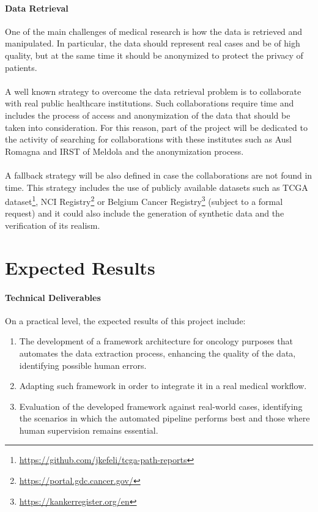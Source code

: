 \documentclass{scrartcl}
\begin{document}
\paragraph{Data Retrieval}{One of the main challenges of medical research is how the data is retrieved and manipulated. 
In particular, the data should represent real cases and be of high quality, but at the same time it should be anonymized to protect the privacy of patients.   
\\\\
A well known strategy to overcome the data retrieval problem is to collaborate with real public healthcare institutions. Such collaborations require time and includes the process of access and anonymization of the data that should be taken into consideration. For this reason, part of the project will be dedicated to the activity of searching for collaborations with these institutes such as Ausl Romagna and IRST of Meldola and the anonymization process.
\\\\
A fallback strategy will be also defined in case the collaborations are not found in time. This strategy includes the use of publicly available datasets such as TCGA dataset\footnote{\url{https://github.com/jkefeli/tcga-path-reports}}, NCI Registry\footnote{\url{https://portal.gdc.cancer.gov/}} or Belgium Cancer Registry\footnote{\url{https://kankerregister.org/en}} (subject to a formal request) and it could also include the generation of synthetic data and the verification of its realism.
}
\section{Expected Results}

\paragraph{Technical Deliverables}{On a practical level, the expected results of this project include:
\begin{enumerate}
    \item The development of a framework architecture for oncology purposes that automates the data extraction process, enhancing the quality of the data, identifying possible human errors.
    \item Adapting such framework in order to integrate it in a real medical workflow.
    \item Evaluation of the developed framework against real-world cases, identifying the scenarios in which the automated pipeline performs best and those where human supervision remains essential.
\end{enumerate}
}
\end{document}

